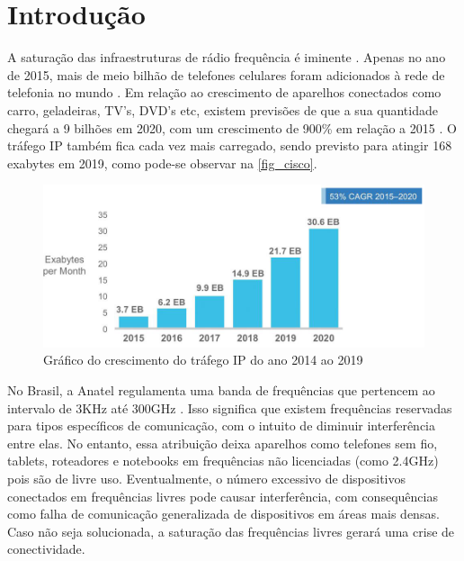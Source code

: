 	\chapter*[Introdução]{Introdução} %
		
	A saturação das infraestruturas de rádio frequência é iminente \cite{load-balancing}. Apenas no ano de 2015, mais de meio bilhão de telefones celulares foram adicionados à rede de telefonia no mundo \cite{cisco-forecast}. Em relação ao crescimento de aparelhos conectados como carro, geladeiras, TV’s, DVD’s etc, existem previsões de que a sua quantidade chegará a 9 bilhões em 2020, com um crescimento 	de 900\% em relação a 2015 \cite{erricson-report}. O tráfego IP também fica cada vez mais carregado, sendo previsto para atingir 168 exabytes em 2019, como pode-se observar na \autoref{fig_cisco}.
	
	\begin{figure}[h!]
		\caption{\label{fig_cisco}Gráfico do crescimento do tráfego IP do ano 2014 ao 2019}
		\begin{center}
			\includegraphics[scale=0.5]{cisco_exabytes_per_month.png}
		\end{center}
	\end{figure}
	
	No Brasil, a Anatel regulamenta uma banda de frequências que pertencem ao intervalo  de 3KHz até 300GHz \cite{faixa-anatel}. Isso significa que existem frequências reservadas para tipos específicos de comunicação, com o intuito de diminuir interferência entre elas. No entanto, essa atribuição deixa aparelhos como telefones sem fio, tablets, roteadores e notebooks em frequências não licenciadas (como 2.4GHz) pois são de livre uso. Eventualmente, o número excessivo de dispositivos conectados em  frequências livres pode causar interferência, com consequências como falha de comunicação generalizada de dispositivos em áreas mais densas. Caso não seja solucionada, a saturação das frequências livres gerará uma crise de conectividade. \par 
	
